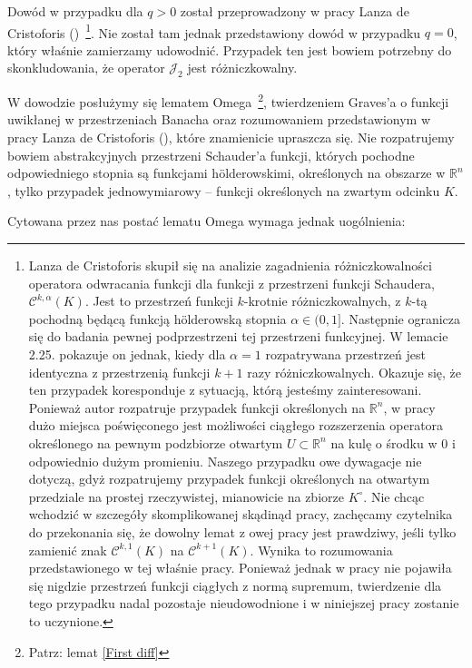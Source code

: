 	Dowód w przypadku dla $q > 0$ został przeprowadzony w pracy Lanza de Cristoforis (\citeyear[][twr. 5.9., str 477]{Lanza2})~\footnote{Lanza de Cristoforis skupił się na analizie zagadnienia różniczkowalności operatora odwracania funkcji dla funkcji z przestrzeni funkcji Schaudera, $\mathcal{C}^{k,\alpha}(K)$. Jest to przestrzeń funkcji $k$-krotnie różniczkowalnych, z $k$-tą pochodną będącą funkcją h\"olderowską stopnia $\alpha\in(0,1]$. Następnie ogranicza się do badania pewnej podprzestrzeni tej przestrzeni funkcyjnej. W lemacie 2.25. pokazuje on jednak, kiedy dla $\alpha =1 $ rozpatrywana przestrzeń jest identyczna z przestrzenią funkcji $k+1$ razy różniczkowalnych. Okazuje się, że ten przypadek koresponduje z sytuacją, którą jesteśmy zainteresowani. Ponieważ autor rozpatruje przypadek funkcji określonych na $\mathbb{R}^{n}$, w pracy dużo miejsca poświęconego jest możliwości ciągłego rozszerzenia operatora określonego na pewnym podzbiorze otwartym $U \subset \mathbb{R}^n$ na kulę o środku w $0$ i odpowiednio dużym promieniu. Naszego przypadku owe dywagacje nie dotyczą, gdyż rozpatrujemy przypadek funkcji określonych na otwartym przedziale na prostej rzeczywistej, mianowicie na zbiorze $K^{\circ}$. Nie chcąc wchodzić w szczegóły skomplikowanej skądinąd pracy, zachęcamy czytelnika do przekonania się, że dowolny lemat z owej pracy jest prawdziwy, jeśli tylko zamienić znak $\mathcal{C}^{k,1}(K)$ na $\mathcal{C}^{k+1}(K)$. Wynika to rozumowania przedstawionego w tej właśnie pracy. Ponieważ jednak w pracy nie pojawiła się nigdzie przestrzeń funkcji ciągłych z normą supremum, twierdzenie dla tego przypadku nadal pozostaje nieudowodnione i w niniejszej pracy zostanie to uczynione.}. Nie został tam jednak przedstawiony dowód w przypadku $q=0$, który właśnie zamierzamy udowodnić. Przypadek ten jest bowiem potrzebny do skonkludowania, że operator $\mathcal{J}_2$ jest różniczkowalny.

	W dowodzie posłużymy się lematem Omega~\footnote{Patrz: lemat \ref{First diff}}, twierdzeniem Graves'a o funkcji uwikłanej w przestrzeniach Banacha \citep[][twr. VIII.3.1., str. 215]{Maurin} oraz rozumowaniem przedstawionym w pracy Lanza de Cristoforis (\citeyear[][twr. 5.9., str 477]{Lanza2}), które znamienicie upraszcza się.  Nie rozpatrujemy bowiem abstrakcyjnych przestrzeni Schauder'a funkcji, których pochodne odpowiedniego stopnia są funkcjami h\"olderowskimi, określonych na obszarze w $\mathbb{R}^{n}$, tylko przypadek jednowymiarowy -- funkcji określonych na zwartym odcinku $K$. 

	Cytowana przez nas postać lematu Omega wymaga jednak uogólnienia:

